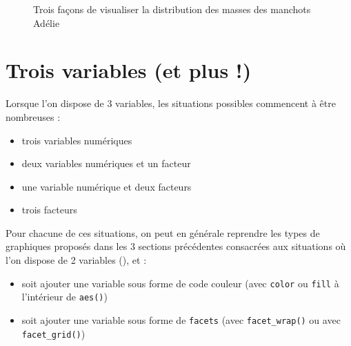 \documentclass[
  a4paper,
  DIV=11,
  numbers=noendperiod,
  oneside]{scrreprt}
\providecommand{\tightlist}{%
  \setlength{\itemsep}{0pt}\setlength{\parskip}{0pt}}\usepackage{longtable,booktabs,array}
\begin{document}
\begin{figure}


\caption{\label{fig-comboxplot}Trois façons de visualiser la
distribution des masses des manchots Adélie}

\end{figure}%

\section{Trois variables (et plus !)}\label{trois-variables-et-plus}

Lorsque l'on dispose de 3 variables, les situations possibles commencent
à être nombreuses :

\begin{itemize}
\tightlist
\item
  trois variables numériques
\item
  deux variables numériques et un facteur
\item
  une variable numérique et deux facteurs
\item
  trois facteurs
\end{itemize}

Pour chacune de ces situations, on peut en générale reprendre les types
de graphiques proposés dans les 3 sections précédentes consacrées aux
situations où l'on dispose de 2 variables (), et :

\begin{itemize}
\tightlist
\item
  soit ajouter une variable sous forme de code couleur (avec
  \texttt{color} ou \texttt{fill} à l'intérieur de \texttt{aes()})
\item
  soit ajouter une variable sous forme de \texttt{facets} (avec
  \texttt{facet\_wrap()} ou avec \texttt{facet\_grid()})
\end{itemize}
\end{document}
